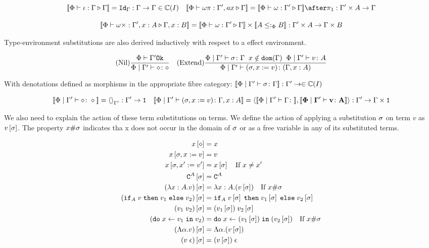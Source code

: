 \documentclass{Report}
\begin{document}
\[
    \deno{\pewrel{\i}{\G}{\G}} = \idg: \G \rightarrow \G \in \C(I)
    \quad
    \deno{\pewrel{\w\pi}{\G', ax}{\G}} = \deno{\pewrel{\w}{\G'}{\G}}\after\p: \G'\times A \rightarrow \G
\]

\[
    {\bf [\![}\Phi\vdash \omega\times : \Gamma', x: A \triangleright \Gamma, x: B{\bf ]\!]} = {\bf [\![}\Phi\vdash \omega : \Gamma' \triangleright \Gamma{\bf ]\!]}\times {\bf [\![}A\leq:_\Phi B{\bf ]\!]}: \Gamma'\times A \rightarrow \Gamma\times B
\]

Type-environment substitutions are also derived inductively with respect to a effect environment.


\[
    (\text{Nil}) \frac{\Phi\vdash \Gamma' \texttt{Ok}}{\Phi\mid\Gamma' \vdash \diamond \colon \diamond}
    \quad
    (\text{Extend}) \frac{
        \Phi\mid\Gamma' \vdash \sigma \colon \Gamma
        \;\;
        x\notin\texttt{dom}(\Gamma)
        \;\;
        \Phi\mid\Gamma' \vdash v \colon A
    }{
        \Phi\mid\Gamma' \vdash (\sigma, x := v) \colon (\Gamma, x: A)
    }
\]

With denotations defined as morphisms in the appropriate fibre category: ${\bf [\![}\Phi\mid\Gamma' \vdash \sigma \colon \Gamma{\bf ]\!]}: \Gamma' \rightarrow \in \mathbb{C}(I)$

\[
    \deno{\etyperelation{\P}{\G'}{\nil}{\nil}} = \term{\G'}: \G' \rightarrow \1
    \quad
    \deno{\etyperelation{\P}{\G'}{(\si, x \setto v)}{\gax}} = \pr{\deno{\etyperelation{\P}{\G'}{\G}}}{\deno{\etyperelation{\P}{\G'}{v}{A}}}: \G' \rightarrow \G\times \1
\]

We also need to explain the action of these term substitutions on terms. We define the action of applying a substitution $\sigma$  on term $v$ as $v\left[\sigma\right]$. The property $x\#\sigma$ indicates tha x does not occur in the domain of $\sigma$ or as a free variable in any of its substituted terms.

\begin{align}
    x\left[\diamond\right] & = x \\
    x\left[\sigma,x:= v\right] & = v \\
    x\left[\sigma,x':= v'\right] & = x\left[\sigma\right]\quad\text{If }x \neq x'\\
    \texttt{C}^{A}\left[\sigma\right] & = \texttt{C}^{A} \\
    (\lambda x : A. v)\left[\sigma\right] &= \lambda x : A. (v\left[\sigma\right])\quad\text{If }x\#\sigma\\
    (\texttt{if}_{A}\; v\; \texttt{then}\; v_1 \;\texttt{else} \; v_2)\left[\sigma\right] &= \texttt{if}_{A}\; v\left[\sigma\right]\; \texttt{then}\; v_1\left[\sigma\right] \;\texttt{else} \; v_2\left[\sigma\right]\\
    (v_1\; v_2)\left[\sigma\right]&= (v_1\left[\sigma\right])\; v_2\left[\sigma\right]\\
    (\texttt{do}\; x \leftarrow v_1 \;\texttt{in}\; v_2)&= \texttt{do}\; x \leftarrow (v_1\left[\sigma\right]) \;\texttt{in}\; (v_2\left[\sigma\right])\quad\text{If } x\#\sigma\\
    (\Lambda \alpha. v)\left[\sigma\right] & = \Lambda \alpha. (v\left[\sigma\right])\\
    (v\;\epsilon)\left[\sigma\right] & = (v\left[\sigma\right])\;\epsilon\\
\end{align}
\end{document}
